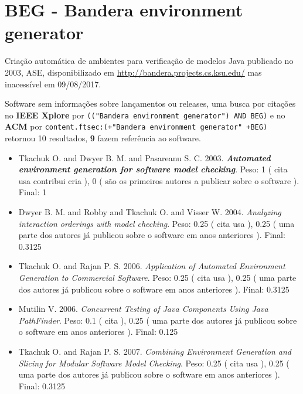 \section{BEG - Bandera environment generator}

Criação automática de ambientes para verificação de modelos Java
publicado no 2003, ASE,
disponibilizado em \url{http://bandera.projects.cs.ksu.edu/}
mas inacessível em 09/08/2017.

Software sem informações sobre lançamentos ou releases,
uma busca por citações no {\bf IEEE Xplore} por
\texttt{(("Bandera environment generator") AND BEG)}
e no {\bf ACM} por
\texttt{content.ftsec:(+"Bandera environment generator" +BEG)}
retornou
10 resultados,
{\bf 9} fazem referência ao software.

\begin{itemize}
\item Tkachuk O. and Dwyer B. M. and Pasareanu S. C.
      2003.
        \textbf{\textit{ Automated environment generation for software model checking}}.
      Peso:
      1 (
          cita
          usa
          contribui
          cria
      ),
      0 (
são os primeiros autores a publicar sobre o software
      ).
      Final:
      1

\item Dwyer B. M. and Robby and Tkachuk O. and Visser W.
      2004.
        \textit{ Analyzing interaction orderings with model checking}.
      Peso:
      0.25 (
          cita
          usa
      ),
      0.25 (
uma parte dos autores já publicou sobre o software em anos anteriores
      ).
      Final:
      0.3125

\item Tkachuk O. and Rajan P. S.
      2006.
        \textit{ Application of Automated Environment Generation to Commercial Software}.
      Peso:
      0.25 (
          cita
          usa
      ),
      0.25 (
uma parte dos autores já publicou sobre o software em anos anteriores
      ).
      Final:
      0.3125

\item Mutilin V.
      2006.
        \textit{ Concurrent Testing of Java Components Using Java PathFinder}.
      Peso:
      0.1 (
          cita
      ),
      0.25 (
uma parte dos autores já publicou sobre o software em anos anteriores
      ).
      Final:
      0.125

\item Tkachuk O. and Rajan P. S.
      2007.
        \textit{ Combining Environment Generation and Slicing for Modular Software Model Checking}.
      Peso:
      0.25 (
          cita
          usa
      ),
      0.25 (
uma parte dos autores já publicou sobre o software em anos anteriores
      ).
      Final:
      0.3125


\end{itemize}
